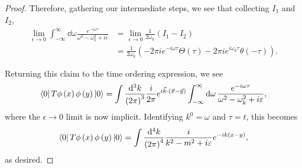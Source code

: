 \begin{proof}
    Therefore, gathering our intermediate steps, we see that collecting $I_1$ and $I_2$, 
    \begin{align}
        \lim_{\epsilon \to 0} \int_{-\infty}^{\infty} \dd{\omega} \frac{e^{-i \omega \tau}}{\omega^2 - \omega_k^2 + i\epsilon} &= \lim_{\epsilon \to 0} \frac{1}{2 \omega_k} \left( I_1 - I_2 \right)  \\
        &= \frac{1}{2\omega_k} \left( -2\pi i e^{-i \omega \tau} \Theta \left( \tau \right) - 2 \pi i e^{i \omega_k \tau}\theta \left( -\tau \right)  \right)
    .\end{align}

    Returning this claim to the time ordering expression, we see
    \begin{align}
        \bra{0} T \phi \left( x \right) \phi \left( y \right) \ket{0} = \int \frac{\dd{^3k}}{\left( 2\pi \right)^3} \frac{i}{2\pi}  e^{i \vec{k} \cdot \left( \vec{x} - \vec{y} \right) } \int_{-\infty}^{\infty} \dd{\omega} \frac{e^{-i \omega \tau}}{\omega^2 - \omega_k^2 + i \varepsilon}
    ,\end{align}
    where the $\epsilon \to 0$ limit is now implicit. Identifying $k^{0} = \omega$ and $\tau = t$, this becomes
    \begin{align}
        \bra{0} T \phi \left( x \right) \phi \left( y \right) \ket{0} = \int \frac{\dd{^4k}}{\left( 2\pi \right)^4} \frac{i}{k^2 - m^2 + i \varepsilon} e^{-i k \left( x - y \right) }
    ,\end{align}
    as desired.
\end{proof}


